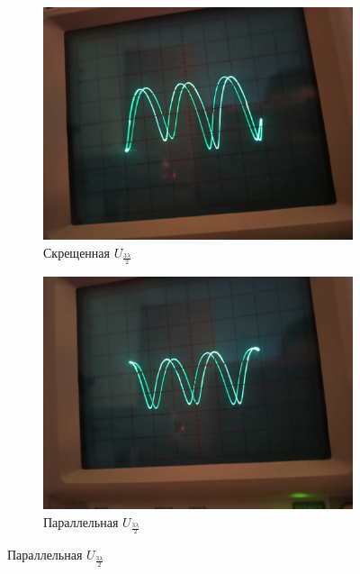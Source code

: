 \documentclass[a4paper, 12pt]{article}
\begin{document}
\begin{figure}[!h]
\begin{subfigure}{0.5\textwidth}
    \includegraphics[scale = 0.15]{intersect3}
    \centering
    \caption{Скрещенная $U_\frac{3 \lambda}{2}$}
\end{subfigure}
\begin{subfigure}{0.5\textwidth}
    \includegraphics[scale = 0.15]{parallel3}
    \centering
    \caption{Параллельная $U_\frac{3 \lambda}{2}$}
\end{subfigure}

\end{figure}
\end{document}
